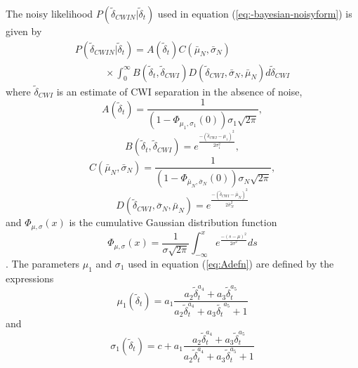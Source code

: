 \documentclass[extra, onecolumn, doublespacing]{gji}
\begin{document}
The noisy likelihood
$P(\widetilde{\delta}_{CWIN}|\widetilde{\delta}_t)$ used in equation
(\ref{eq:-bayesian-noisyform}) is given by
\begin{equation}
\begin{array}{l}
\label{eq-likelihood-int}
P(\widetilde{\delta}_{CWIN}|\widetilde{\delta}_t)  =
A(\widetilde{\delta}_t) C(\bar{\mu}_N, \bar{\sigma}_N)  \\
\hspace{3em} \times \int_0^\infty
B(\widetilde{\delta}_t,\widetilde{\delta}_{CWI})
D(\widetilde{\delta}_{CWI},\bar{\sigma}_N,\bar{\mu}_N )
d\widetilde{\delta}_{CWI}
\end{array}
\end{equation}
where $\widetilde{\delta}_{CWI}$ is an estimate of CWI separation in the absence
of noise,
\begin{equation}
\label{eq:Adefn}
A(\widetilde{\delta}_t) = \frac{1}{(1-\Phi_{\mu_1,\sigma_1}(0))\sigma_1\sqrt{2\pi} },
\end{equation}
\begin{equation}
B(\widetilde{\delta}_t,\widetilde{\delta}_{CWI})=e^{  \frac{-(\widetilde{\delta}_{CWI}-\mu_1)^2}{2\sigma_1^2} },
\end{equation}
\begin{equation}
\label{eq:Cdefn}
C(\bar{\mu}_N, \bar{\sigma}_N) =  \frac{1}{(1-\Phi_{\bar{\mu}_N,\bar{\sigma}_N}(0))\sigma_N\sqrt{2\pi}},
\end{equation}
\begin{equation}
D(\widetilde{\delta}_{CWI},\bar{\sigma}_N,\bar{\mu}_N )=e^{  \frac{-(\widetilde{\delta}_{CWI}-\bar{\mu}_N)^2}{2 \bar{\sigma}_N ^2} }
\end{equation}
and $\Phi_{\mu,\sigma}(x)$ is the cumulative Gaussian distribution function
\begin{equation}
\label{eq-cummulative-Gaussian}
\Phi_{\mu,\sigma}(x) = \frac{1}{\sigma \sqrt{2 \pi}}
\int_{-\infty}^x e^{  \frac{-(s-\mu)^2}{2\sigma^2}  } ds
\end{equation}
\citep{dr_Robinson11a}. The parameters $\mu_1$ and $\sigma_1$ used
in equation (\ref{eq:Adefn}) are defined by the expressions
\begin{equation}
\label{eq:mu1}
\mu_1(\widetilde{\delta}_t) = a_1\frac{a_2 \widetilde{\delta}_t^{a_4}+a_3
\widetilde{\delta}_t^{a_5}}{a_2 \widetilde{\delta}_t^{a_4}+a_3 \widetilde{\delta_t}^{a_5}+1}
\end{equation}
and
\begin{equation}
\label{eq:sigma1}
\sigma_1(\widetilde{\delta}_t) = c + a_1\frac{a_2 \widetilde{\delta}_t^{a_4}+
a_3 \widetilde{\delta}_t^{a_5}}{a_2 \widetilde{\delta}_t^{a_4}+a_3 \widetilde{\delta}_t^{a_5}+1}
\end{equation}
\end{document}
